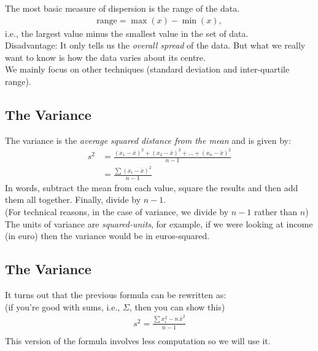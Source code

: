 \documentclass[]{report}
\begin{document}
The most basic measure of dispersion is the { range} of the data.\\[-0.4cm]

\begin{align*}
\boxed{\text{range} = \max(x) - \min(x)},
\end{align*}
i.e., the largest value minus the smallest value in the set of data.\\[0.8cm]

Disadvantage: It only tells us the \emph{overall spread} of the data. But what we really want to know is how the data varies about its centre.\\[0.5cm]

We mainly focus on other techniques (standard deviation and inter-quartile range).




\subsection{The Variance}

The { variance} is the \emph{average squared distance from the mean} and is given by:\\[-0.6cm]
\begin{align*}
s^2 &= \frac{(x_1 - \bar x)^2 + (x_2 - \bar x)^2 + \ldots + (x_n - \bar x)^2}{n-1}\\[0.2cm]
&= \frac{\sum (x_i - \bar x)^2}{n-1}
\end{align*}
In words, subtract the mean from each value, square the results and then add them all together. Finally, divide by $n-1$.\\
{\footnotesize(For technical reasons, in the case of variance, we divide by $n-1$ rather than $n$)}\\[0.7cm]
The units of variance are \emph{squared-units}, for example, if we were looking at income (in euro) then the variance would be in euros-squared.




\subsection{The Variance}

It turns out that the previous formula can be rewritten as:\\
{\footnotesize(if you're good with sums, i.e., $\Sigma$, then you can show this)}\\[0.2cm]
\begin{align*}
\boxed{s^2 = \frac{\sum x_i^2 - n\,{\bar x}^2}{n-1}}\\
\end{align*}
This version of the formula involves less computation so we will use it.\\[0.5cm]
\end{document}
